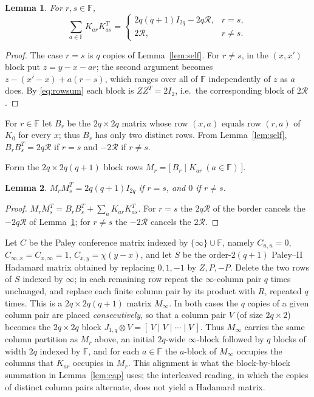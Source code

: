 \documentclass[11pt]{article}
\newtheorem{lemma}{Lemma}
\newcommand{\F}{\mathbb F}
\newcommand{\J}{J}
\newcommand{\Rcal}{\mathcal R}
\begin{document}
\begin{lemma}\label{lem:cross}
For \(r,s\in\F\),
\[
        \sum_{a\in\F}K_{ar}K_{as}^{T}=
        \begin{cases}
        2q(q+1)I_{2q}-2q\Rcal,&r=s,\\
        2\Rcal,&r\neq s.
        \end{cases}
\]
\end{lemma}

\begin{proof}
The case \(r=s\) is \(q\) copies of Lemma~\ref{lem:self}.  For
\(r\neq s\), in the \((x,x')\) block put \(z=y-x-ar\); the second
argument becomes \(z-(x'-x)+a(r-s)\), which ranges over all of \(\F\)
independently of \(z\) as \(a\) does.  By \eqref{eq:rowsum} each block is
\(Z Z^{T}=2I_2\), i.e.\ the corresponding block of \(2\Rcal\).
\end{proof}

For \(r\in\F\) let \(B_r\) be the \(2q\times2q\) matrix whose row
\((x,a)\) equals row \((r,a)\) of \(K_0\) for every \(x\); thus \(B_r\)
has only two distinct rows.  From Lemma~\ref{lem:self},
\(B_rB_s^{T}=2q\Rcal\) if \(r=s\) and \(-2\Rcal\) if \(r\neq s\).

Form the \(2q\times2q(q+1)\) block rows
\(M_r=\bigl[\,B_r\mid K_{ar}\ (a\in\F)\,\bigr].\)

\begin{lemma}\label{lem:finite}
\(M_rM_s^{T}=2q(q+1)I_{2q}\) if \(r=s\), and \(0\) if \(r\neq s\).
\end{lemma}

\begin{proof}
\(M_rM_s^{T}=B_rB_s^{T}+\sum_aK_{ar}K_{as}^{T}\).  For \(r=s\) the
\(2q\Rcal\) of the border cancels the \(-2q\Rcal\) of
Lemma~\ref{lem:cross}; for \(r\neq s\) the \(-2\Rcal\) cancels the
\(2\Rcal\).
\end{proof}

Let \(C\) be the Paley conference matrix indexed by
\(\{\infty\}\cup\F\), namely \(C_{u,u}=0\),
\(C_{\infty,x}=C_{x,\infty}=1\), \(C_{x,y}=\chi(y-x)\), and let \(S\) be
the order-\(2(q+1)\) Paley--II Hadamard matrix obtained by replacing
\(0,1,-1\) by \(Z,P,-P\).  Delete the two rows of \(S\) indexed by
\(\infty\); in each remaining row repeat the \(\infty\)-column pair
\(q\) times unchanged, and replace each finite column pair by its
product with \(R\), repeated \(q\) times.  This is a
\(2q\times2q(q+1)\) matrix \(M_\infty\).  In both cases the \(q\) copies
of a given column pair are placed \emph{consecutively}, so that a column
pair \(V\) (of size \(2q\times2\)) becomes the \(2q\times2q\) block
\(\J_{1,q}\otimes V=[\,V\mid V\mid\cdots\mid V\,]\).
Thus \(M_\infty\) carries the same column partition as \(M_r\)
above, an initial \(2q\)-wide \(\infty\)-block followed by \(q\) blocks
of width \(2q\) indexed by \(\F\), and for each \(a\in\F\) the
\(a\)-block of \(M_\infty\) occupies the columns that \(K_{ar}\) occupies
in \(M_r\).  This alignment is what the block-by-block summation in
Lemma~\ref{lem:cap} uses; the interleaved reading, in which the copies of
distinct column pairs alternate, does not yield a Hadamard matrix.
\end{document}
